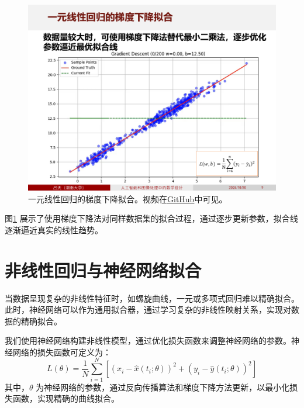 \documentclass[
    report,     %
    oneside,    %
    UTF8,       %
    zihao=-4    %
]{config} %
\begin{document}
\begin{figure}[H]
    \centering
    \includegraphics[width=\linewidth]{figures/回归分析与梯度下降/2.PNG}
    \caption[一元线性回归的梯度下降拟合]{一元线性回归的梯度下降拟合。视频在\href{https://github.com/PhD-TianLv/Mathematical-Statistics-in-Artificial-Intelligence-and-Image-Processing/blob/main/videos/1-一元线性回归的梯度下降拟合.mp4}{GitHub}\footnotemark 中可见。}
    \label{fig:linear_gradient_descent}
\end{figure}


图\ref{fig:linear_gradient_descent} 展示了使用梯度下降法对同样数据集的拟合过程，通过逐步更新参数，拟合线逐渐逼近真实的线性趋势。

\section{非线性回归与神经网络拟合}

当数据呈现复杂的非线性特征时，如螺旋曲线，一元或多项式回归难以精确拟合。此时，神经网络可以作为通用拟合器，通过学习复杂的非线性映射关系，实现对数据的精确拟合。

我们使用神经网络构建非线性模型，通过优化损失函数来调整神经网络的参数。神经网络的损失函数可定义为：
\begin{equation}
    L(\theta) = \frac{1}{N} \sum_{i=1}^{N} \left[ (x_i - \hat{x}(t_i; \theta))^2 + (y_i - \hat{y}(t_i; \theta))^2 \right]
\end{equation}
其中，$\theta$ 为神经网络的参数，通过反向传播算法和梯度下降方法更新，以最小化损失函数，实现精确的曲线拟合。
\end{document}
